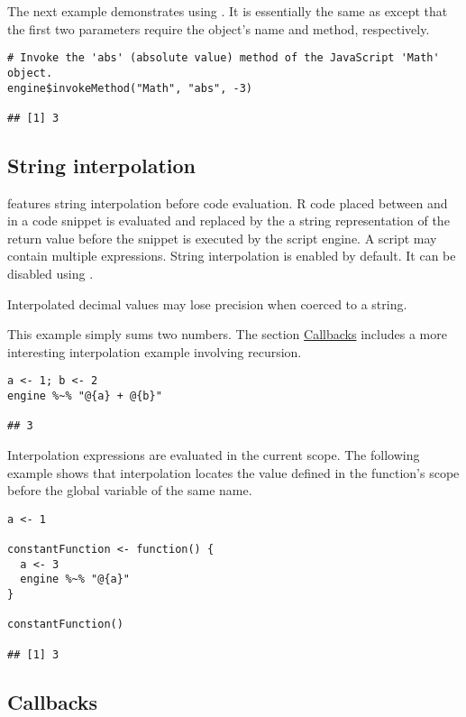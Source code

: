 The next example demonstrates using . It is essentially the same as  except that the first two parameters require the object's name and method, respectively.

\begin{verbatim}
# Invoke the 'abs' (absolute value) method of the JavaScript 'Math' object.
engine$invokeMethod("Math", "abs", -3)

## [1] 3
\end{verbatim}

\subsection{String interpolation}

 features string interpolation before code evaluation. R code placed between  and \code{\}} in a code snippet is evaluated and replaced by the a string representation of the return value before the snippet is executed by the script engine. A script may contain multiple  expressions. String interpolation is enabled by default. It can be disabled using .

 Interpolated decimal values may lose precision when coerced to a string.

This example simply sums two numbers. The section \hyperlink{callbacks}{Callbacks} includes a more interesting interpolation example involving recursion.

\begin{verbatim}
a <- 1; b <- 2
engine %~% "@{a} + @{b}"

## 3
\end{verbatim}

Interpolation expressions are evaluated in the current scope. The following example shows that interpolation locates the value defined in the function's scope before the global variable of the same name.

\begin{verbatim}
a <- 1

constantFunction <- function() {
  a <- 3
  engine %~% "@{a}"
}

constantFunction()

## [1] 3
\end{verbatim}

\hypertarget{callbacks}{\subsection{Callbacks}}

